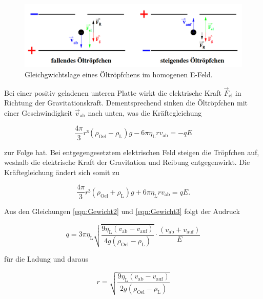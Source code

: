 \begin{figure}
    \centering
    \includegraphics[width=\textwidth]{GewichtV.png}
    \caption{Gleichgwichtslage eines Öltröpfchens im homogenen E-Feld\cite{Versuchsanleitung_v503}.}
    \label{fig:GewichtV}
\end{figure}

\noindent Bei einer positiv geladenen unteren Platte wirkt die elektrische Kraft $\vec{F}_\text{el}$
in Richtung der Gravitationskraft. Dementsprechend sinken die Öltröpfchen mit einer Geschwindigkeit $\vec{v}_\text{ab}$
nach unten, was die Kräftegleichung 

\begin{equation}
\label{eqn:Gewicht2}
    \frac{4\pi}{3}r³\left(\rho_\text{Oel}-\rho_\text{L}\right)g - 6\pi{}\eta_\text{L}rv_\text{ab} = -qE
\end{equation}

\noindent zur Folge hat. Bei entgegengesetztem elektrischen Feld steigen die Tröpfchen auf, weshalb die
elektrische Kraft der Gravitation und Reibung entgegenwirkt. Die Kräftegleichung ändert sich somit zu 

\begin{equation}
\label{eqn:Gewicht3}
\frac{4\pi}{3}r³\left(\rho_\text{Oel}+\rho_\text{L}\right)g + 6\pi{}\eta_\text{L}rv_\text{ab} = qE.
\end{equation}

\noindent Aus den Gleichungen \eqref{eqn:Gewicht2} und \eqref{eqn:Gewicht3} folgt der Audruck

\begin{equation*}
    q = 3\pi{}\eta_\text{L}\sqrt{\frac{9\eta_\text{L}\left(v_\text{ab}-v_\text{auf}\right)}{4g\left(\rho_\text{Oel}-\rho_\text{L}\right)}}\cdot\frac{\left(v_\text{ab}+v_\text{auf}\right)}{E}
\end{equation*}

\noindent für die Ladung und daraus

\begin{equation*}
    r = \sqrt{\frac{9\eta_\text{L}\left(v_\text{ab}-v_\text{auf}\right)}{2g\left(\rho_\text{Oel}-\rho_\text{L}\right)}}
\end{equation*}

